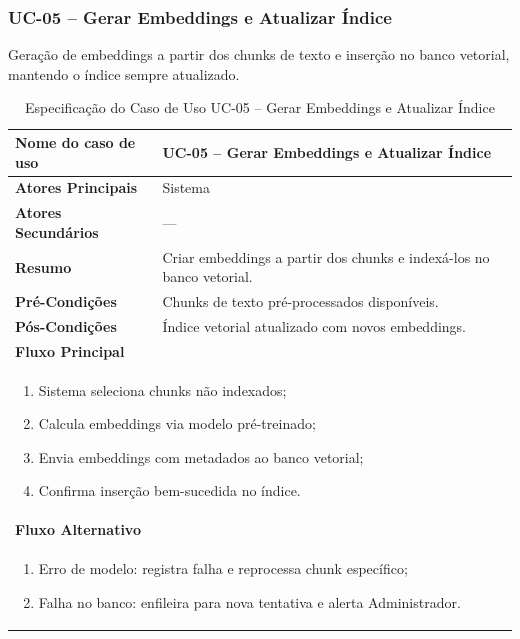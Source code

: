 \begin{description}
\subsubsection{UC-05 – Gerar Embeddings e Atualizar Índice}
\noindent Geração de embeddings a partir dos chunks de texto e inserção no banco vetorial, mantendo o índice sempre atualizado.
\begin{table}[H]
  \centering
  \caption{Especificação do Caso de Uso UC-05 – Gerar Embeddings e Atualizar Índice}
  \label{tab:uc05}
  \begin{tabular}{|p{4cm}|p{11cm}|}
    \hline
    \textbf{Nome do caso de uso}    & UC-05 – Gerar Embeddings e Atualizar Índice \\ \hline
    \textbf{Atores Principais}      & Sistema                                      \\ \hline
    \textbf{Atores Secundários}     & —                                            \\ \hline
    \textbf{Resumo}                 & Criar embeddings a partir dos chunks e indexá-los no banco vetorial. \\ \hline
    \textbf{Pré-Condições}          & Chunks de texto pré-processados disponíveis. \\ \hline
    \textbf{Pós-Condições}          & Índice vetorial atualizado com novos embeddings. \\ \hline
    \multicolumn{2}{|l|}{\textbf{Fluxo Principal}} \\ \hline
    \multicolumn{2}{|p{15cm}|}{%
      \begin{enumerate}[leftmargin=*]
        \item Sistema seleciona chunks não indexados;
        \item Calcula embeddings via modelo pré-treinado;
        \item Envia embeddings com metadados ao banco vetorial;
        \item Confirma inserção bem-sucedida no índice.
      \end{enumerate}
    } \\ \hline
    \multicolumn{2}{|l|}{\textbf{Fluxo Alternativo}} \\ \hline
    \multicolumn{2}{|p{15cm}|}{%
      \begin{enumerate}[label=\arabic* a\,.]
        \item Erro de modelo: registra falha e reprocessa chunk específico;
        \item Falha no banco: enfileira para nova tentativa e alerta Administrador.
      \end{enumerate}
    } \\ \hline
  \end{tabular}
\end{table}


\end{description}
